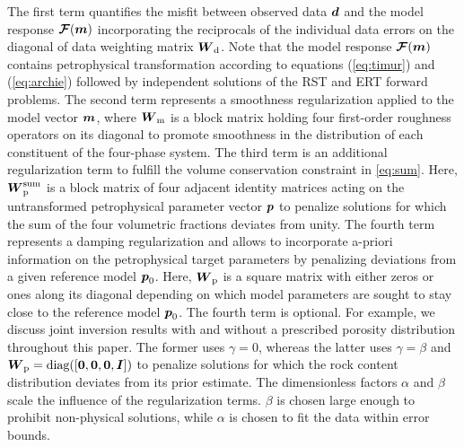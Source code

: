 \documentclass[extra]{gji}
\begin{document}
The first term quantifies the misfit between observed data $\mitbf{d}$ and the model response $\mitbf{\mathcal{F}}(\mitbf{m})$ incorporating the reciprocals of the individual data errors on the diagonal of data weighting matrix $\mitbf{W}_\text{d}$.
Note that the model response $\mitbf{\mathcal{F}}(\mitbf{m})$ contains petrophysical transformation according to equations (\ref{eq:timur}) and (\ref{eq:archie}) followed by independent solutions of the RST and ERT forward problems.
The second term represents a smoothness regularization applied to the model vector $\mitbf{m}$, where $\mitbf{W}_\text{m}$ is a block matrix holding four first-order roughness operators on its diagonal to promote smoothness in the distribution of each constituent of the four-phase system.
The third term is an additional regularization term to fulfill the volume conservation constraint in \autoref{eq:sum}.
Here, $\mitbf{W}^\text{sum}_\text{p}$ is a block matrix of four adjacent identity matrices acting on the untransformed petrophysical parameter vector $\mitbf{p}$ to penalize solutions for which the sum of the four volumetric fractions deviates from unity.
The fourth term represents a damping regularization and allows to incorporate a-priori information on the petrophysical target parameters by penalizing deviations from a given reference model $\mitbf{p}_\text{0}$.
Here, $\mitbf{W}_\text{p}$ is a square matrix with either zeros or ones along its diagonal depending on which model parameters are sought to stay close to the reference model $\mitbf{p}_\text{0}$.
The fourth term is optional.
For example, we discuss joint inversion results with and without a prescribed porosity distribution throughout this paper.
The former uses $\gamma = 0$, whereas the latter uses $\gamma = \beta$ and $\mitbf{W}_\text{p} = \text{diag}([\mitbf{0},\mitbf{0},\mitbf{0},\mitbf{I}])$ to penalize solutions for which the rock content distribution deviates from its prior estimate.
The dimensionless factors $\alpha$ and $\beta$ scale the influence of the regularization terms.
$\beta$ is chosen large enough to prohibit non-physical solutions, while $\alpha$ is chosen to fit the data within error bounds.
\end{document}
